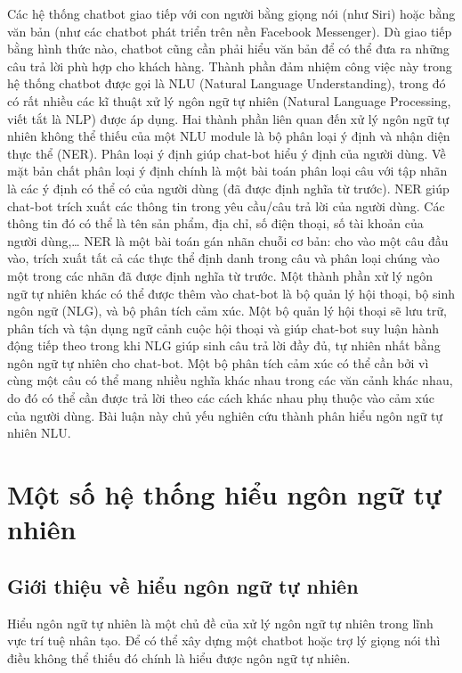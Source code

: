 Các hệ thống chatbot giao tiếp với con người bằng giọng nói (như Siri) hoặc bằng văn bản (như các chatbot phát triển trên nền Facebook Messenger). Dù giao tiếp bằng hình thức nào, chatbot cũng cần phải hiểu văn bản để có thể đưa ra những câu trả lời phù hợp cho khách hàng. Thành phần đảm nhiệm công việc này trong hệ thống chatbot được gọi là NLU (Natural Language Understanding), trong đó có rất nhiều các kĩ thuật xử lý ngôn ngữ tự nhiên (Natural Language Processing, viết tắt là NLP) được áp dụng.
Hai thành phần liên quan đến xử lý ngôn ngữ tự nhiên không thể thiếu của một NLU module là bộ phân loại ý định và nhận diện thực thể (NER). Phân loại ý định giúp chat-bot hiểu ý định của người dùng. Về mặt bản chất phân loại ý định chính là một bài toán phân loại câu với tập nhãn là các ý định có thể có của người dùng (đã được định nghĩa từ trước). NER giúp chat-bot trích xuất các thông tin trong yêu cầu/câu trả lời của người dùng. Các thông tin đó có thể là tên sản phẩm, địa chỉ, số điện thoại, số tài khoản của người dùng,… NER là một bài toán gán nhãn chuỗi cơ bản: cho vào một câu đầu vào, trích xuất tất cả các thực thể định danh trong câu và phân loại chúng vào một trong các nhãn đã được định nghĩa từ trước.
Một thành phần xử lý ngôn ngữ tự nhiên khác có thể được thêm vào chat-bot là bộ quản lý hội thoại, bộ sinh ngôn ngữ (NLG), và bộ phân tích cảm xúc. Một bộ quản lý hội thoại sẽ lưu trữ, phân tích và tận dụng ngữ cảnh cuộc hội thoại và giúp chat-bot suy luận hành động tiếp theo trong khi NLG giúp sinh câu trả lời đầy đủ, tự nhiên nhất bằng ngôn ngữ tự nhiên cho chat-bot. Một bộ phân tích cảm xúc có thể cần bởi vì cùng một câu có thể mang nhiều nghĩa khác nhau trong các văn cảnh khác nhau, do đó có thể cần được trả lời theo các cách khác nhau phụ thuộc vào cảm xúc của người dùng.
Bài luận này chủ yếu nghiên cứu thành phân hiểu ngôn ngữ tự nhiên NLU.

\section{Một số hệ thống hiểu ngôn ngữ tự nhiên}

\subsection{Giới thiệu về hiểu ngôn ngữ tự nhiên}

Hiểu ngôn ngữ tự nhiên là một chủ đề của xử lý ngôn ngữ tự nhiên trong lĩnh vực trí tuệ nhân tạo. Để có thể xây dựng một chatbot hoặc trợ lý giọng nói thì điều không thể thiếu đó chính là hiểu được ngôn ngữ tự nhiên.

